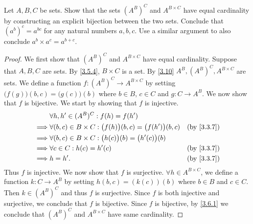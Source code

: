 \begin{ex}\label{ex:3.6.6}
  Let \(A, B, C\) be sets.
  Show that the sets \((A^B)^C\) and \(A^{B \times C}\) have equal cardinality by constructing an explicit bijection between the two sets.
  Conclude that \((a^b)^c = a^{bc}\) for any natural numbers \(a, b, c\).
  Use a similar argument to also conclude \(a^b \times a^c = a^{b+c}\).
\end{ex}

\begin{proof}
  We first show that \((A^B)^C\) and \(A^{B \times C}\) have equal cardinality.
  Suppose that \(A, B, C\) are sets.
  By \cref{3.5.4}, \(B \times C\) is a set.
  By \cref{3.10} \(A^B, (A^B)^C, A^{B \times C}\) are sets.
  We define a function \(f : (A^B)^C \to A^{B \times C}\) by setting \(\big(f(g)\big)(b, c) = \big(g(c)\big)(b)\) where \(b \in B\), \(c \in C\) and \(g : C \to A^B\).
  We now show that \(f\) is bijective.
  We start by showing that \(f\) is injective.
  \begin{align*}
             & \forall h, h' \in (A^B)^C : f(h) = f(h')                                                                \\
    \implies & \forall (b, c) \in B \times C : \big(f(h)\big)(b, c) = \big(f(h')\big)(b, c) & \text{(by \cref{3.3.7})} \\
    \implies & \forall (b, c) \in B \times C : \big(h(c)\big)(b) = \big(h'(c)\big)(b)                                  \\
    \implies & \forall c \in C : h(c) = h'(c)                                               & \text{(by \cref{3.3.7})} \\
    \implies & h = h'.                                                                      & \text{(by \cref{3.3.7})}
  \end{align*}
  Thus \(f\) is injective.
  We now show that \(f\) is surjective.
  \(\forall h \in A^{B \times C}\), we define a function \(k : C \to A^B\) by setting \(h(b, c) = (k(c))(b)\) where \(b \in B\) and \(c \in C\).
  Then \(k \in (A^B)^C\) and thus \(f\) is surjective.
  Since \(f\) is both injective and surjective, we conclude that \(f\) is bijective.
  Since \(f\) is bijective, by \cref{3.6.1} we conclude that \((A^B)^C\) and \(A^{B \times C}\) have same cardinality.


\end{proof}
